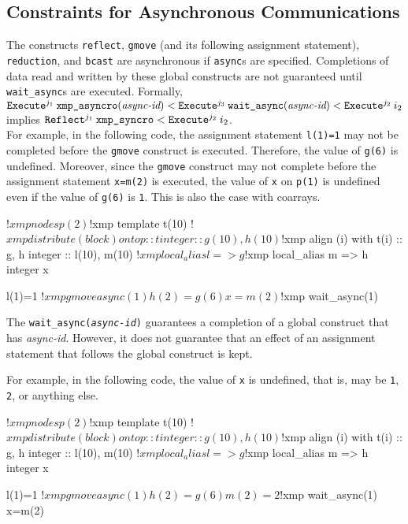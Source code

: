 \subsection{Constraints for Asynchronous Communications}

The constructs \texttt{reflect}, \texttt{gmove} (and its following
assignment statement), \texttt{reduction}, and \texttt{bcast} are
asynchronous if \texttt{async}s are specified.  Completions of data
read and written by these global constructs are not guaranteed until
\texttt{wait\_async}s are executed.  Formally,\\

\noindent
$\texttt{Execute}^{j_1} \: {\texttt{xmp\_asyncro}(\textit{async-id})} < \texttt{Execute}^{j_3} \: {\texttt{wait\_async}(\textit{async-id})} < \texttt{Execute}^{j_2} \: {i_2}$\\
implies $\texttt{Reflect}^{j_1} \: {\texttt{xmp\_syncro}} < \texttt{Execute}^{j_2} \: {i_2}$.\\

For example, in the following code, the assignment statement \texttt{l(1)=1} may
not be completed before the \texttt{gmove} construct is executed.
Therefore, the value of \texttt{g(6)} is undefined.  Moreover, since
the \texttt{gmove} construct may not complete before the assignment statement
\texttt{x=m(2)} is executed, the value of \texttt{x} on \texttt{p(1)}
is undefined even if the value of \texttt{g(6)} is \texttt{1}.  This
is also the case with coarrays.
\begin{center}
\begin{XFexample}
!$xmp nodes p(2)
!$xmp template t(10)
!$xmp distribute (block) onto p :: t
      integer :: g(10), h(10)
!$xmp align (i) with t(i) :: g, h
      integer :: l(10), m(10)
!$xmp local_alias l => g
!$xmp local_alias m => h
      integer x

      l(1)=1
!$xmp gmove async(1)
      h(2)=g(6)
      x=m(2)
!$xmp wait_async(1)
\end{XFexample}
\end{center}

The \texttt{wait\_async(\textit{async-id})} guarantees a completion of
a global construct that has \textit{async-id}.  However, it does not
guarantee that an effect of an assignment statement that follows the global
construct is kept.




For example, in the following code, the value of \texttt{x} is
undefined, that is, may be \texttt{1}, \texttt{2}, or anything else.
\begin{center}
\begin{XFexample}
!$xmp nodes p(2)
!$xmp template t(10)
!$xmp distribute (block) onto p :: t
      integer :: g(10), h(10)
!$xmp align (i) with t(i) :: g, h
      integer :: l(10), m(10)
!$xmp local_alias l => g
!$xmp local_alias m => h
      integer x

      l(1)=1
!$xmp gmove async(1)
      h(2)=g(6)
      m(2)=2
!$xmp wait_async(1)
      x=m(2)
\end{XFexample}
\end{center}



%


